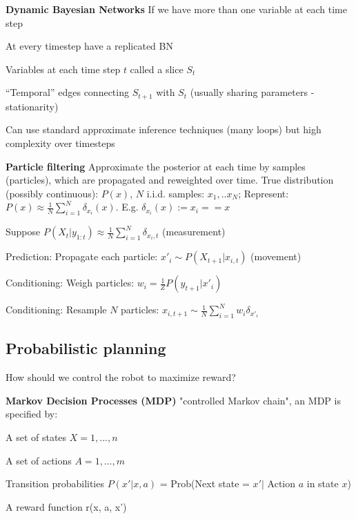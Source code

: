 \documentclass[a4paper, 11pt, landscape]{article}
\begin{document}
\begin{multicols*}{3}
\textbf{Dynamic Bayesian Networks}
If we have more than one variable at each time step
\begin{compactitem}
	\item At every timestep have a replicated BN
	\item Variables at each time step $t$ called a slice $S_t$
	\item “Temporal” edges connecting $S_{t+1}$ with $S_t$ (usually sharing parameters - stationarity)
	\item Can use standard approximate inference techniques (many loops) but high complexity over timesteps
\end{compactitem}


\textbf{Particle filtering}
Approximate the posterior at each time by samples (particles), which are propagated and reweighted over time.
True distribution (possibly continuous): $P(x)$, $N$ i.i.d. samples: $x_1,..x_N$; Represent: $P(x) \approx \frac{1}{N} \sum_{i=1}^{N} \delta_{x_i}(x)$. E.g. $\delta_{x_i}(x):= x_i == x$

\begin{compactitem}
	\item Suppose $P(X_t | y_{1:t}) \approx \frac{1}{N} \sum_{i=1}^{N} \delta_{x_i, t}$ (measurement)
	\item Prediction: Propagate each particle: $x'_i \sim P(X_{t+1} | x_{i,t})$ (movement)
	\item Conditioning: Weigh particles: $w_i = \frac{1}{Z}P(y_{t+1} | x'_i)$
	\item Conditioning: Resample $N$ particles: $x_{i, t+1} \sim \frac{1}{N} \sum_{i=1}^{N} w_i\delta_{x'_i}$ 
\end{compactitem}

\subsection{Probabilistic planning}
How should we control the robot to maximize reward?

\textbf{Markov Decision Processes (MDP)}
"controlled Markov chain", an MDP is specified by:
\begin{compactitem}
	\item A set of states $X={1,...,n}$
	\item A set of actions $A={1,...,m}$
	\item Transition probabilities $P(x' | x, a)$ = Prob(Next state = $x' |$ Action $a$ in state $x$)
	\item A reward function r(x, a, x')
	

\end{compactitem}
\end{multicols*}
\end{document}
